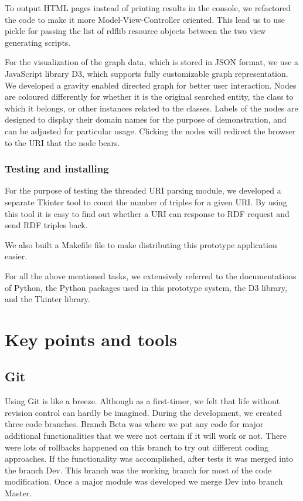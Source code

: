 \documentclass[12pt]{cls}
\begin{document}
To output HTML pages instead of printing results in the console, we refactored the code to make it more Model-View-Controller oriented. This lead us to use pickle for passing the list of rdflib resource objects between the two view generating scripts.

For the visualization of the graph data, which is stored in JSON format, we use a JavaScript library D3, which supports fully customizable graph representation. We developed a gravity enabled directed graph for better user interaction. Nodes are coloured differently for whether it is the original searched entity, the class to which it belongs, or other instances related to the classes. Labels of the nodes are designed to display their domain names for the purpose of demonstration, and can be adjusted for particular usage. Clicking the nodes will redirect the browser to the URI that the node bears.

\subsection{Testing and installing}

For the purpose of testing the threaded URI parsing module, we developed a separate Tkinter tool to count the number of triples for a given URI. By using this tool it is easy to find out whether a URI can response to RDF request and send RDF triples back.

We also built a Makefile file to make distributing this prototype application easier.

For all the above mentioned tasks, we extensively referred to the documentations of Python, the Python packages used in this prototype system, the D3 library, and the Tkinter library.

\chapter{Key points and tools}

\section{Git}

Using Git is like a breeze. Although as a first-timer, we felt that life without revision control can hardly be imagined. During the development, we created three code branches. Branch Beta was where we put any code for major additional functionalities that we were not certain if it will work or not. There were lots of rollbacks happened on this branch to try out different coding approaches. If the functionality was accomplished, after tests it was merged into the branch Dev. This branch was the working branch for most of the code modification. Once a major module was developed we merge Dev into branch Master. 
\end{document}
